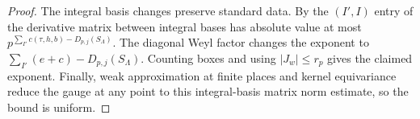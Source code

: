\begin{proof}
The integral basis changes preserve standard data. By  the $(I',I)$ entry of the derivative matrix between integral bases has absolute value at most $p^{\sum_{I'}c(\tau,h,b)-D_{p,j}(S_\Lambda)}$. The diagonal Weyl factor changes the exponent to $\sum_{I'}(e+c)-D_{p,j}(S_\Lambda)$. Counting boxes and using $|J_w|\le r_p$ gives the claimed exponent. Finally, weak approximation at finite places and kernel equivariance reduce the gauge at any point to this integral-basis matrix norm estimate, so the bound is uniform.
\end{proof}

